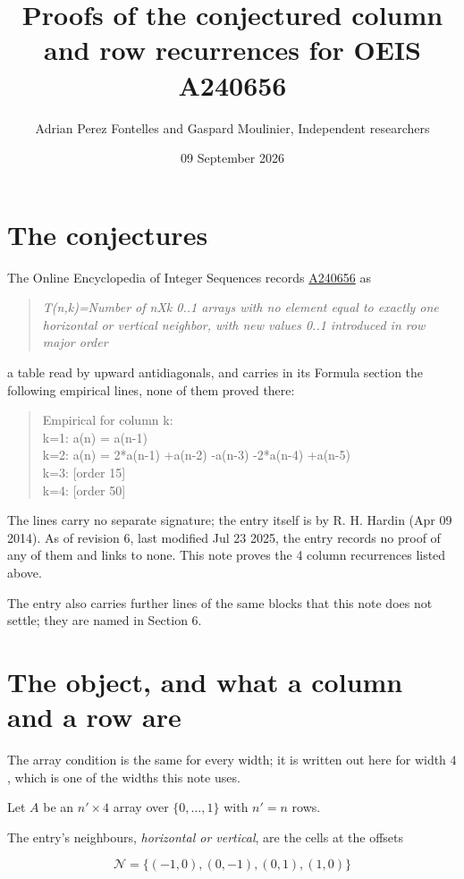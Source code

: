 \documentclass[11pt]{article}
\title{Proofs of the conjectured column and row recurrences for OEIS A240656}
\author{Adrian Perez Fontelles and Gaspard Moulinier, Independent researchers}
\date{09 September 2026}
\theoremstyle{definition}
\begin{document}
\maketitle
\section{The conjectures}

The Online Encyclopedia of Integer Sequences records \href{https://oeis.org/A240656}{A240656} as

\begin{quote}\itshape T(n,k)=Number of nXk 0..1 arrays with no element equal to exactly one horizontal or vertical neighbor, with new values 0..1 introduced in row major order\end{quote}

a table read by upward antidiagonals, and carries in its Formula section the following empirical lines, none of them proved there:

\begin{quote}\ttfamily Empirical for column k:\\
k=1: a(n) = a(n-1)\\k=2: a(n) = 2*a(n-1) +a(n-2) -a(n-3) -2*a(n-4) +a(n-5)\\k=3: [order 15]\\k=4: [order 50]\end{quote}

The lines carry no separate signature; the entry itself is by R. H. Hardin (Apr 09 2014). As of revision 6, last modified Jul 23 2025, the entry records no proof of any of them and links to none. This note proves the 4 column recurrences listed above.

The entry also carries further lines of the same blocks that this note does not settle; they are named in Section 6.

\section{The object, and what a column and a row are}

The array condition is the same for every width; it is written out here for width $4$, which is one of the widths this note uses.

Let $A$ be an $n' \times 4$ array over $\{0,\dots,1\}$ with $n' = n$ rows.

The entry's neighbours, {\itshape horizontal or vertical}, are the cells at the offsets

\[\mathcal{N} = \{(-1,0), (0,-1), (0,1), (1,0)\}\]
\end{document}
